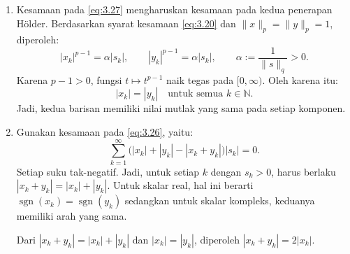 \documentclass[aspectratio=169,11pt]{beamer}
\theoremstyle{definition}
\newcommand{\N}{\mathbb{N}}
\newcommand{\sgn}{\operatorname{sgn}}
\begin{document}
\begin{frame}[allowframebreaks]{\insertsection}{\insertsubsection}
\begin{enumerate}
          Khususnya, untuk pasangan vektor satuan yang sedang ditinjau:
          \begin{equation*}
            \|x+y\|_p\leq 2,\quad \text{untuk} \quad \|x\|_p=\|y\|_p=1.
          \end{equation*}
          Untuk menunjukkan bahwa ketaksamaan ini tegas ketika $x\neq y$, andaikan $\|x+y\|_p=2$. Maka $s\neq 0$ dan seluruh ketaksamaan pada \eqref{eq:3.26} serta \eqref{eq:3.27} harus berupa kesamaan.


    \item Kesamaan pada \eqref{eq:3.27} mengharuskan kesamaan pada kedua penerapan H\"older. Berdasarkan syarat kesamaan \eqref{eq:3.20} dan $\|x\|_p=\|y\|_p=1$, diperoleh:
          \begin{equation*}
            |x_k|^{p-1}=\alpha|s_k|, \qquad
            |y_k|^{p-1}=\alpha|s_k|,
            \qquad \alpha:=\frac{1}{\|s\|_q}>0.
          \end{equation*}
          Karena $p-1>0$, fungsi $t\mapsto t^{p-1}$ naik tegas pada $[0,\infty)$. Oleh karena itu:
          \begin{equation*}
            |x_k|=|y_k| \quad \text{untuk semua } k\in\N.
          \end{equation*}
          Jadi, kedua barisan memiliki nilai mutlak yang sama pada setiap komponen.


    \item Gunakan kesamaan pada \eqref{eq:3.26}, yaitu:
          \begin{equation*}
            \sum_{k=1}^{\infty}
            \bigl(|x_k|+|y_k|-|x_k+y_k|\bigr)|s_k|=0.
          \end{equation*}
          Setiap suku tak-negatif. Jadi, untuk setiap $k$ dengan $s_k>0$, harus berlaku $|x_k+y_k|=|x_k|+|y_k|$. Untuk skalar real, hal ini berarti $\sgn(x_k)=\sgn(y_k)$ sedangkan untuk skalar kompleks, keduanya memiliki arah yang sama.

          Dari $|x_k+y_k|=|x_k|+|y_k|$ dan $|x_k|=|y_k|$, diperoleh $|x_k+y_k|=2|x_k|$.


\end{enumerate}
\end{frame}
\end{document}
